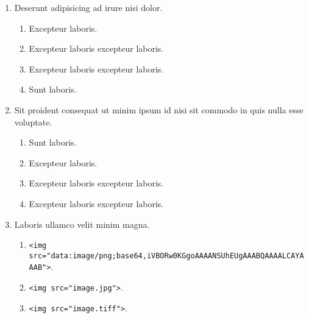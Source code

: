 \documentclass[a4paper,12pt]{article}
\begin{document}
\begin{enumerate}[label=\textbf{\arabic*.}]
\begin{multicols}{2}
\begin{enumerate}
		\item  Excepteur laboris excepteur laboris.
    
		\item  Excepteur laboris excepteur laboris.
  
	\end{enumerate}

\end{multicols}
\item Deserunt adipisicing ad irure nisi dolor.
\begin{multicols}{2}
	\begin{enumerate}
		\item  Excepteur laboris.
    
		\item  Excepteur laboris excepteur laboris.
    
		\item  Excepteur laboris excepteur laboris.
  
		\item  Sunt laboris.
    
	\end{enumerate}

\end{multicols}
\item Sit proident consequat ut minim ipsum id nisi sit commodo in quis nulla esse voluptate.
\begin{multicols}{2}
	\begin{enumerate}
		\item  Sunt laboris.
    
		\item  Excepteur laboris.
    
		\item  Excepteur laboris excepteur laboris.
    
		\item  Excepteur laboris excepteur laboris.
  
	\end{enumerate}

\end{multicols}
\item Laboris ullamco velit minim magna.
	\begin{enumerate}
		\item  \texttt{<img src="{}data:image/png;base64,iVBORw0KGgoAAAANSUhEUgAAABQAAAALCAYAAAB"{}>}.
    
		\item  \texttt{<img src="{}image.jpg"{}>}.
    
		\item  \texttt{<img src="{}image.tiff"{}>}.
  

\end{enumerate}
\end{enumerate}
\end{document}

